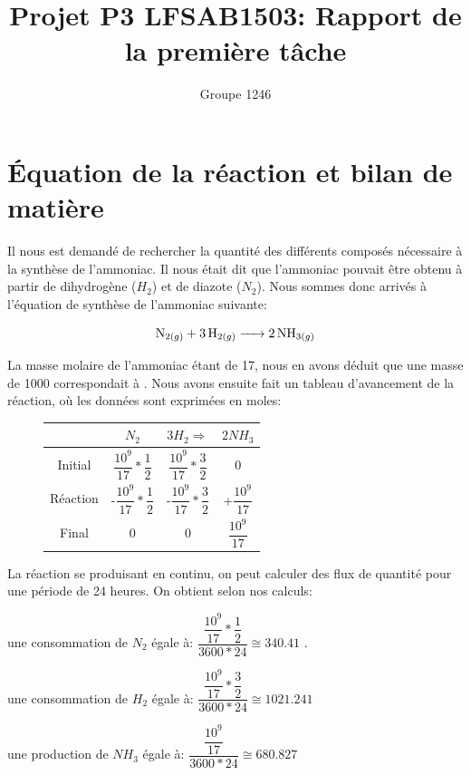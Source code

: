 \documentclass[11pt,a4paper]{report}
\author{Groupe 1246}
\title{Projet P3 LFSAB1503: Rapport de la première tâche}
\begin{document}
\maketitle

\section*{Équation de la réaction et bilan de matière}

Il nous est demandé de rechercher la quantité des différents composés nécessaire à la synthèse de l'ammoniac.
Il nous était dit que l'ammoniac pouvait être obtenu à partir de dihydrogène ($H_2$) et de diazote ($N_2$).
Nous sommes donc arrivés à l'équation de synthèse de l'ammoniac suivante: 


 $$\ce{N_{2(g)} + 3H_{2(g)} -> 2NH_{3(g)}}$$

La masse molaire de l'ammoniac étant de \unit{17}{\gram\per\mole}, nous en avons déduit que une masse de \unit{1000}{\ton}
correspondait à \unit{}{\mole}. Nous avons ensuite fait un tableau d'avancement de la réaction,
où les données sont exprimées en moles: 

\begin{figure}[h]
\begin{tabular}{|c|c|c|c|}
\hline 
 & $N_2$ & $3H_2 \Rightarrow$ & $2NH_3$ \\ 
\hline 
Initial & $\dfrac{10^{9}}{17}*\dfrac{1}{2}$ & $\dfrac{10^{9}}{17}*\dfrac{3}{2}$ & 0 \\ 
\hline 
Réaction & -$\dfrac{10^{9}}{17}*\dfrac{1}{2}$ & -$\dfrac{10^{9}}{17}*\dfrac{3}{2}$ & +$\dfrac{10^{9}}{17}$ \\ 
\hline 
Final & 0 & 0 & $\dfrac{10^{9}}{17}$ \\ 
\hline 
\end{tabular} 
\end{figure}

La réaction se produisant en continu, on peut calculer des flux de quantité pour une période de 24 heures.
On obtient selon nos calculs:

\begin{itemize}
  \item{une consommation de $N_2$ égale à: $\dfrac{\dfrac{10^{9}}{17}*\dfrac{1}{2}}{3600*24} \cong 340.41 $ \unit{}{\mole\per\second}.}
  \item{une consommation de $H_2$ égale à: $\dfrac{\dfrac{10^{9}}{17}*\dfrac{3}{2}}{3600*24} \cong 1021.241 $\unit{}{\mole\per\second}
  \item{une production de $NH_3$ égale à: $\dfrac{\dfrac{10^{9}}{17}}{3600*24} \cong 680.827$ \unit{}{\mole\per\second}
}}\end{itemize}
\end{document}
